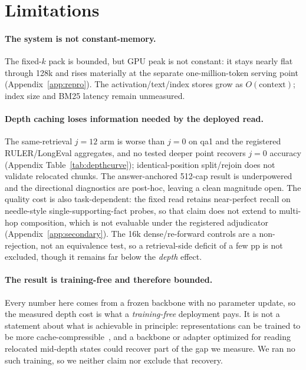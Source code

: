 \section{Limitations}
\label{sec:limitations}

\paragraph{The system is not constant-memory.}
The fixed-$k$ pack is bounded, but GPU peak is not constant: it stays nearly
flat through 128k and rises materially at the separate \mbox{one-million-token}
serving point (Appendix~\ref{app:repro}).  The activation/text/index stores
grow as $O(\text{context})$; index size and BM25 latency remain unmeasured.

\paragraph{Depth caching loses information needed by the deployed read.}
The same-retrieval $j=12$ arm is worse than $j=0$ on qa1 and the registered
RULER/LongEval aggregates, and no tested deeper point recovers $j{=}0$ accuracy
(Appendix Table~\ref{tab:depthcurve}); identical-position split/rejoin does not
validate relocated chunks.  The answer-anchored 512-cap result is underpowered
and the directional diagnostics are post-hoc, leaving a clean magnitude open.
The quality cost is also task-dependent: the fixed read retains near-perfect
recall on needle-style single-supporting-fact probes, so that claim does not
extend to multi-hop composition, which is not evaluable under the registered
adjudicator (Appendix~\ref{app:secondary}).  The 16k dense/re-forward controls
are a non-rejection, not an equivalence test, so a retrieval-side deficit of a
few pp is not excluded, though it remains far below the \emph{depth} effect.

\paragraph{The result is training-free and therefore bounded.}
Every number here comes from a frozen backbone with no parameter update, so the
measured depth cost is what a \emph{training-free} deployment pays.  It is not a
statement about what is achievable in principle: representations can be trained
to be more cache-compressible~\citep{kvcat}, and a backbone or adapter optimized
for reading relocated mid-depth states could recover part of the gap we measure.
We ran no such training, so we neither claim nor exclude that recovery.

